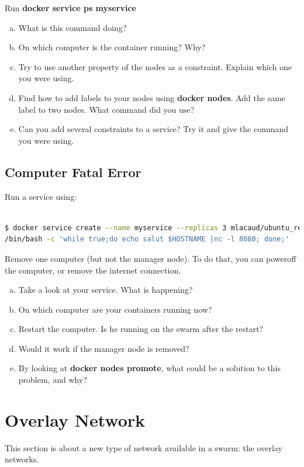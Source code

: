 \documentclass[a4paper,11pt]{exam}
\begin{document}
\begin{questions}
	\question Run \textbf{docker service ps myservice}
	\begin{enumerate}[(a)]
		\item What is this command doing?
		\item On which computer is the container running? Why?
		\item Try to use another property of the nodes as a constraint. Explain which one you were using.
		\item Find how to add labels to your nodes using \textbf{docker nodes}. Add the same label to two nodes. What command did you use?
		\item Can you add several constraints to a service? Try it and give the command you were using.
	\end{enumerate}
\end{questions}

\subsection{Computer Fatal Error}
Run a service using:
\begin{lstlisting}[frame=single,language={sh}]  % Start your code-block

$ docker service create --name myservice --replicas 3 mlacaud/ubuntu_re355 \
/bin/bash -c 'while true;do echo salut $HOSTNAME |nc -l 8080; done;'

\end{lstlisting}
\begin{questions}
	\question Remove one computer (but not the manager node). To do that, you can poweroff the computer, or remove the internet connection.
	\begin{enumerate}[(a)]
		\item Take a look at your service. What is happening?
		\item On which computer are your containers running now?
		\item Restart the computer. Is he running on the swarm after the restart?
		\item Would it work if the manager node is removed?
		\item By looking at \textbf{docker nodes promote}, what could be a solution to this problem, and why?
	\end{enumerate}
\end{questions}
 
\section{Overlay Network} 
This section is about a new type of network available in a swarm: the overlay networks. 
\end{document}
